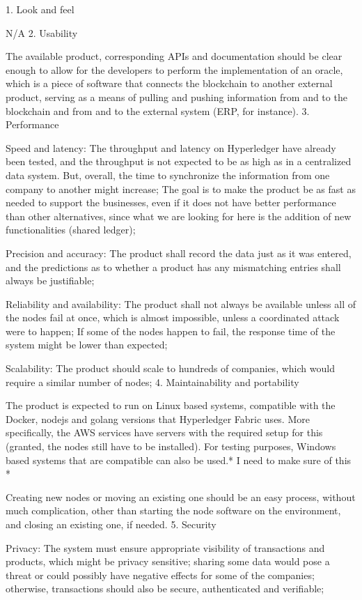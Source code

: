 {	1. Look and feel
		\par N/A
	2. Usability
		\par The available product, corresponding APIs  and documentation should be clear enough to allow for the developers to perform the implementation of an oracle, which is a piece of software that connects the blockchain to another external product, serving as a means of pulling and pushing information from and to the blockchain and from and to the external system (ERP, for instance).
	3. Performance
		\par Speed and latency: The throughput and latency on Hyperledger have already been tested, and the throughput is not expected to be as high as in a centralized data system. But, overall, the time to synchronize the information from one company to another might increase; The goal is to make the product be as fast as needed to support the businesses, even if it does not have better performance than other alternatives, since what we are looking for here is the addition of new functionalities (shared ledger);
		\par Precision and accuracy: The product shall record the data just as it was entered, and the predictions as to whether a product has any mismatching entries shall always be justifiable;
		\par Reliability and availability: The product shall not always be available unless all of the nodes fail at once, which is almost impossible, unless a coordinated attack were to happen; If some of the nodes happen to fail, the response time of the system might be lower than expected;
		\par Scalability: The product should scale to hundreds of companies, which would require a similar number of nodes;
	4. Maintainability and portability
		\par The product is expected to run on Linux based systems, compatible with the Docker, nodejs and golang versions that Hyperledger Fabric uses. More specifically, the AWS services have servers with the required setup for this (granted, the nodes still have to be installed). For testing purposes, Windows based systems that are compatible can also be used.* I need to make sure of this *
		\par Creating new nodes or moving an existing one should be an easy process, without much complication, other than starting the node software on the environment, and closing an existing one, if needed.
	5. Security
		\par Privacy: The system must ensure appropriate visibility of transactions and products, which might be privacy sensitive; sharing some data would pose a threat or could possibly have negative effects for some of the companies; otherwise, transactions should also be secure, authenticated and verifiable;
}
